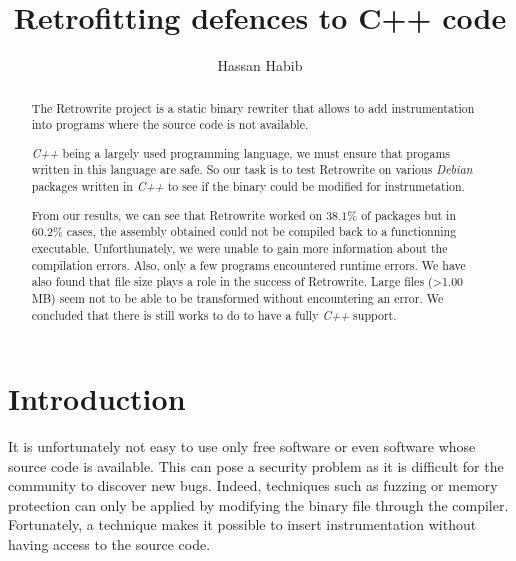 \documentclass[a4paper,11pt,oneside]{report}
\title{Retrofitting defences to C++ code}
\author{Hassan Habib}
\newcommand{\sysname}{Retrowrite\xspace}
\begin{document}
\maketitle

\begin{abstract}
    The \sysname project is a static binary rewriter that allows to add
    instrumentation into programs where the source code is not available.


    \textit{C++} being a largely used programming language, we must ensure that
    progams written in this language are safe. So our task is to test \sysname on
    various \textit{Debian} packages written in \textit{C++} to see if the binary
    could be modified for instrumetation.

    From our results, we can see that \sysname worked on $38.1\%$ of packages but in
    $60.2 \%$ cases, the assembly obtained could not be compiled back to a
    functionning executable. Unforthunately, we were unable to gain more
    information about the compilation errors. Also, only a few programs encountered
    runtime errors. We have also found that file size plays a role in the
    success of \sysname. Large files (>1.00 MB) seem not to be able to be
    transformed without encountering an error.
    We concluded that there is still works to do to have a fully \textit{C++} support.

\end{abstract}


\maketoc

\chapter{Introduction}

%
It is unfortunately not easy to use only free software or even software whose
source code is available. This can pose a security problem as it is difficult
for the community to discover new bugs. Indeed, techniques such as fuzzing or
memory protection can only be applied by modifying the binary file through the
compiler. Fortunately, a technique makes it possible to insert instrumentation
without having access to the source code.
\end{document}
